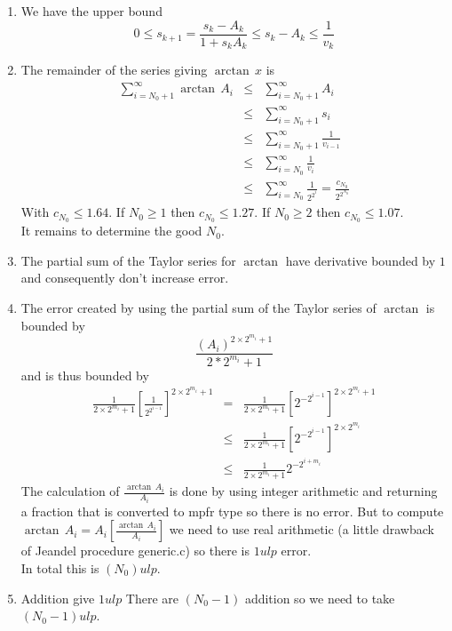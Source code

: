 \documentclass[12pt]{amsart}
\begin{document}
\begin{enumerate}
\item We have the upper bound
\begin{equation*}
0\leq s_{k+1}=\frac{s_k-A_k}{1+s_kA_k}\leq s_k-A_k\leq \frac{1}{v_k}
\end{equation*}
\item The remainder of the series giving $\arctan\,x$ is
\begin{eqnarray*}
\sum_{i=N_0+1}^{\infty}\arctan\,A_i
&\leq &\sum_{i=N_0+1}^{\infty}A_i\\
&\leq &\sum_{i=N_0+1}^{\infty}s_i\\
&\leq &\sum_{i=N_0+1}^{\infty}\frac{1}{v_{i-1}}\\
&\leq &\sum_{i=N_0}^{\infty}\frac{1}{v_{i}}\\
&\leq &\sum_{i=N_0}^{\infty}\frac{1}{2^{2^i}}=\frac{c_{N_0}}{2^{2^{N_0}}}
\end{eqnarray*}
With $c_{N_0}\leq 1.64$. If $N_0\geq 1$ then $c_{N_0}\leq 1.27$. If $N_0\geq 2$ then $c_{N_0}\leq 1.07$.\\
It remains to determine the good $N_0$.
\item The partial sum of the Taylor series for $\arctan$ have derivative bounded by $1$ and consequently don't increase error.
\item The error created by using the partial sum of the Taylor series of $\arctan$ is bounded by
\begin{equation*}
\frac{(A_i)^{2\times 2^{m_i}+1}}{2*2^{m_i}+1}
\end{equation*}
and is thus bounded by
\begin{eqnarray*}
\frac{1}{2 \times 2^{m_i}+1} [\frac{1}{2^{2^{i-1}}}]^{2\times 2^{m_i}+1}
&=&\frac{1}{2 \times 2^{m_i}+1} [2^{-2^{i-1}}]^{2\times 2^{m_i}+1}\\
&\leq &\frac{1}{2 \times 2^{m_i}+1} [2^{-2^{i-1}}]^{2\times 2^{m_i}}\\
&\leq &\frac{1}{2 \times 2^{m_i}+1} 2^{-2^{i+m_i}}
\end{eqnarray*}
The calculation of $\frac{\arctan\,A_i}{A_i}$ is done by using integer arithmetic and returning a fraction that is converted to mpfr type so there is no error. But to compute $\arctan\,A_i=A_i[\frac{\arctan\,A_i}{A_i}]$ we need to use real arithmetic (a little drawback of Jeandel procedure generic.c) so there is $1 ulp$ error.\\
In total this is $(N_0) ulp$.
\item Addition give $1 ulp$ There are $(N_0-1)$ addition so we need to take $(N_0 -1) ulp$.

\end{enumerate}
\end{document}
